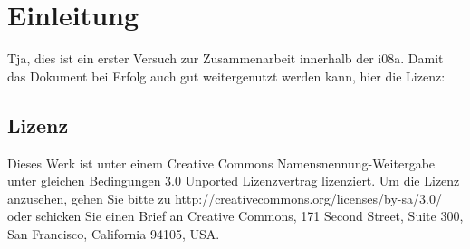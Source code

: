 \chapter{Einleitung}
Tja, dies ist ein erster Versuch zur Zusammenarbeit innerhalb der i08a.
Damit das Dokument bei Erfolg auch gut weitergenutzt werden kann,
hier die Lizenz:

\section{Lizenz}
Dieses Werk ist unter einem Creative Commons Namensnennung-Weitergabe unter gleichen Bedingungen 3.0 Unported Lizenzvertrag lizenziert. Um die Lizenz anzusehen, gehen Sie bitte zu http://creativecommons.org/licenses/by-sa/3.0/ oder schicken Sie einen Brief an Creative Commons, 171 Second Street, Suite 300, San Francisco, California 94105, USA.

